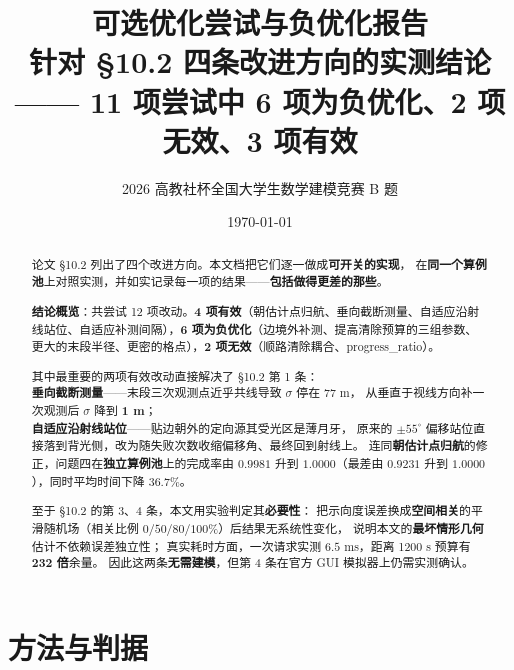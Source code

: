 

\title{\heiti 可选优化尝试与负优化报告\\[4pt]
       \large 针对 §10.2 四条改进方向的实测结论\\[2pt]
       \normalsize —— 11 项尝试中 6 项为负优化、2 项无效、3 项有效}
\author{2026 高教社杯全国大学生数学建模竞赛 B 题}
\date{\today}


\maketitle
\thispagestyle{fancy}

\begin{abstract}
\noindent
论文 §10.2 列出了四个改进方向。本文档把它们逐一做成\textbf{可开关的实现}，
在\textbf{同一个算例池}上对照实测，并如实记录每一项的结果——\textbf{包括做得更差的那些}。

\textbf{结论概览}：共尝试 12 项改动。\textbf{4 项有效}（朝估计点归航、垂向截断测量、自适应沿射线站位、自适应补测间隔），\textbf{6 项为负优化}（边境外补测、提高清除预算的三组参数、更大的末段半径、更密的格点），\textbf{2 项无效}（顺路清除耦合、progress\_ratio）。

其中最重要的两项有效改动直接解决了 §10.2 第 1 条：\\
\textbf{垂向截断测量}——末段三次观测点近乎共线导致 $\sigma$ 停在 77 m，
从垂直于视线方向补一次观测后 $\sigma$ 降到 \textbf{1 m}；\\
\textbf{自适应沿射线站位}——贴边朝外的定向源其受光区是薄月牙，
原来的 $\pm55^{\circ}$ 偏移站位直接落到背光侧，改为随失败次数收缩偏移角、最终回到射线上。
连同\textbf{朝估计点归航}的修正，问题四在\textbf{独立算例池}上的完成率由 $0.9981$ 升到 \textbf{$1.0000$}（最差由 $0.9231$ 升到 $1.0000$），同时平均时间下降 \textbf{$36.7\%$}。

至于 §10.2 的第 3、4 条，本文用实验判定其\textbf{必要性}：
把示向度误差换成\textbf{空间相关}的平滑随机场（相关比例 $0/50/80/100\%$）后结果无系统性变化，
说明本文的\textbf{最坏情形几何}估计不依赖误差独立性；
真实耗时方面，一次请求实测 $6.5$ ms，距离 1200 s 预算有 \textbf{232 倍}余量。
因此这两条\textbf{无需建模}，但第 4 条在官方 GUI 模拟器上仍需实测确认。
\end{abstract}

\tableofcontents
\newpage

\section{方法与判据}

